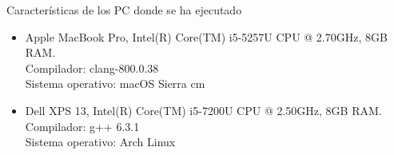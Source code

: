 \documentclass[spanish]{beamer}
\begin{document}
\begin{frame}{Características de los PC donde se ha ejecutado}
\begin{itemize}
\item Apple MacBook Pro, Intel(R) Core(TM) i5-5257U CPU @ 2.70GHz, 8GB RAM.\\  Compilador: clang-800.0.38 \\
Sistema operativo: macOS Sierra
 cm
\item Dell XPS 13, Intel(R) Core(TM) i5-7200U CPU @ 2.50GHz, 8GB RAM.\\
Compilador: g++ 6.3.1\\
Sistema operativo: Arch Linux
\end{itemize}
	
\end{frame}
\end{document}
